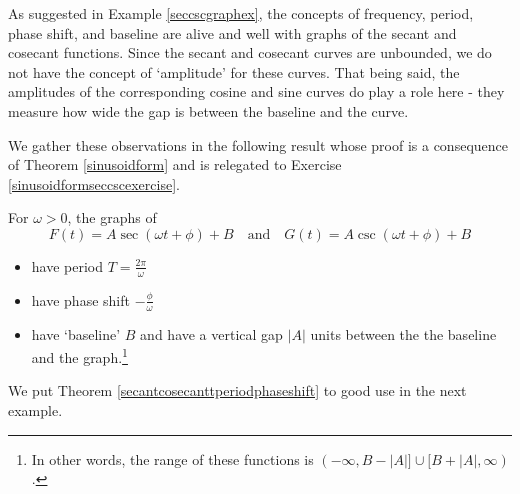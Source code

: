 \documentclass{ximera}
\begin{document}
As suggested in Example \ref{seccscgraphex}, the concepts of frequency, period, phase shift, and baseline are alive and well with graphs of the secant and cosecant functions.  Since the secant and cosecant curves are unbounded, we do not have the concept of `amplitude' for these curves.  That being said, the amplitudes of the corresponding cosine and sine curves do play a role here - they measure how wide the gap  is between the baseline and the curve.  

We gather these observations in the  following result whose proof is a consequence of Theorem \ref{sinusoidform} and is relegated to Exercise \ref{sinusoidformseccscexercise}.


\begin{theorem}  \label{secantcosecanttperiodphaseshift} For $\omega > 0$, the graphs of \[F(t) = A \sec( \omega t + \phi) +B \quad \text{and} \quad G(t) = A \csc( \omega t + \phi) +B  \]

\begin{itemize}

\item  have period  $T = \frac{2\pi}{\omega}$

\item  have phase shift $-\frac{\phi}{\omega}$


\end{itemize}

\begin{itemize}

\item  have  `baseline'  $B$ and have a vertical gap $|A|$ units between the the baseline and the graph.\footnote{In other words, the range of these functions is $(-\infty, B-|A|] \cup [B+|A|, \infty)$.}

\end{itemize}

\end{theorem}






We put Theorem \ref{secantcosecanttperiodphaseshift} to good use in the next example.
\end{document}
